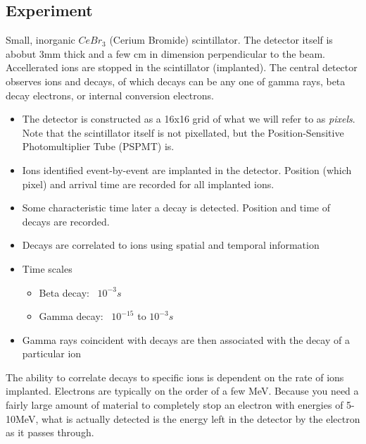 \subsection{Experiment}
Small, inorganic $CeBr_3$ (Cerium Bromide) scintillator. The detector itself is abobut 3mm
thick and a few cm in dimension perpendicular to the beam. Accellerated ions are stopped
in the scintillator (implanted). The central detector observes ions and decays, of which decays can
be any one of gamma rays, beta decay electrons, or internal conversion electrons.
\begin{itemize}
	\item The detector is constructed as a 16x16 grid of what we will refer to as
	\textit{pixels}. Note that the scintillator itself is not pixellated, but the
	Position-Sensitive Photomultiplier Tube (PSPMT) is.
	\item Ions identified event-by-event are implanted in the detector.
	Position (which pixel) and arrival time are recorded for all implanted ions.
	\item Some characteristic time later a decay is detected. Position and time of decays
	are recorded.
	\item Decays are correlated to ions using spatial and temporal information
	\item Time scales
	\begin{itemize}
		\item Beta decay: ~$10^{-3}s$
		\item Gamma decay: ~$10^{-15}$ to $10^{-3}s$
	\end{itemize}
	\item Gamma rays coincident with decays are then associated with the decay of a
	particular ion
\end{itemize}
The ability to correlate decays to specific ions is dependent on the rate of ions 
implanted. Electrons are typically on the order of a few MeV. Because you need a fairly 
large amount of material to completely stop an electron with energies of 5-10MeV,
what is actually detected is the energy left in the detector by the electron as it 
passes through.

